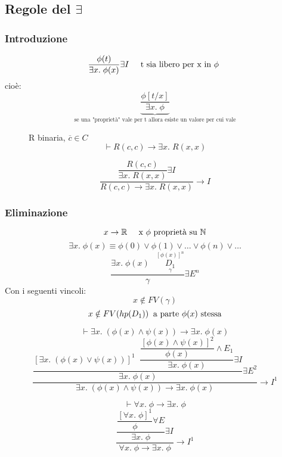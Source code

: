 \documentclass{article}
\theoremstyle{break}
\theoremstyle{break}
\theoremstyle{break}
\theoremstyle{break}
\begin{document}
\subsection{Regole del \( \exists  \)}
\subsubsection{Introduzione}
\[
\frac{\phi(t)}{\exists x.\; \phi(x)} \exists I \;\;\;\;\; \text{t sia libero per x in \( \phi \) }
\] 
cioè:
\[
  \underbrace{\frac{\phi[t/x]}{\exists x.\; \phi}}_{\text{se una "proprietà" vale per t allora
  esiste un valore per cui vale}}
\] 

\begin{figure}[H]
  \begin{example}
    R binaria, \( \overline{c} \in C \) 
    \[
    \vdash R(c,c) \to \exists x.\; R(x,x)
    \] 

    \[
      \dfrac{\dfrac{R(c,c)}{\exists x.\; R(x,x)} \exists I}{R(c,c) \to \exists x.\; R(x,x)} \to I
    \] 
  \end{example}
  
\end{figure}

\subsubsection{Eliminazione}
\[
  x \to \mathbb{R} \;\;\;\;\; \text{x \( \phi \) proprietà su \( \mathbb{N} \)}
\] 
\[
  \exists x.\;\phi(x) \equiv \phi(0) \vee \phi(1) \vee \ldots \vee \phi(n) \vee \ldots
\] 
\[
  \frac{\exists x.\;\phi(x) \;\;\; \underset{\gamma}{\stackrel{[\phi(x)]^n}{D_1}}}{\gamma} \exists E^n
\] 
Con i seguenti vincoli:
\[
  x \notin FV(\gamma)
\] 
\[
x \notin FV(hp(D_1))\;\; \text{a parte \( \phi(x) \) stessa}
\] 

\begin{figure}[H]
  \begin{exercise}
    \[
    \vdash \exists x.\; (\phi(x) \wedge \psi(x)) \to \exists x.\; \phi(x)
    \] 
    \[
      \dfrac{\dfrac{[\exists x.\; (\phi(x) \vee \psi(x))]^1\;\; \dfrac{\dfrac{[\phi(x) \wedge \psi(x)]^2}{\phi(x)} \wedge E_1}{\exists x.\;\phi(x)} \exists I}{\exists x.\;\phi(x)} \exists E^2}{\exists x.\;(\phi(x) \wedge \psi(x)) \to \exists x.\; \phi(x)} \to I^1
    \]  
  \end{exercise}
\end{figure}

\begin{figure}[H]
  \begin{exercise}
    \[
    \vdash \forall x.\; \phi \to \exists x.\;\phi
    \] 
    \[
      \dfrac{\dfrac{\dfrac{[\forall x.\;\phi]^1}{\phi} \forall E}{\exists x.\;\phi} \exists I}{\forall x.\; \phi \to \exists x.\; \phi} \to I^1
    \] 
  \end{exercise}
\end{figure}
\end{document}
